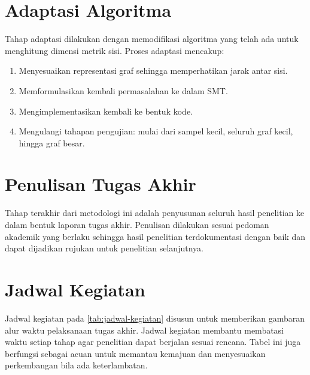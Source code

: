 \section{Adaptasi Algoritma}

Tahap adaptasi dilakukan dengan memodifikasi algoritma yang telah ada untuk menghitung dimensi metrik sisi. Proses adaptasi mencakup:

\begin{enumerate}

	\item Menyesuaikan representasi graf sehingga memperhatikan jarak antar sisi.

	\item Memformulasikan kembali permasalahan ke dalam SMT.

	\item Mengimplementasikan kembali ke bentuk kode.

	\item Mengulangi tahapan pengujian: mulai dari sampel kecil, seluruh graf kecil, hingga graf besar.

\end{enumerate}

\section{Penulisan Tugas Akhir}

Tahap terakhir dari metodologi ini adalah penyusunan seluruh hasil penelitian ke dalam bentuk laporan tugas akhir. Penulisan dilakukan sesuai pedoman akademik yang berlaku sehingga hasil penelitian terdokumentasi dengan baik dan dapat dijadikan rujukan untuk penelitian selanjutnya.

\section{Jadwal Kegiatan}

Jadwal kegiatan pada \autoref{tab:jadwal-kegiatan} disusun untuk memberikan gambaran alur waktu pelaksanaan tugas akhir. Jadwal kegiatan membantu membatasi waktu setiap tahap agar penelitian dapat berjalan sesuai rencana. Tabel ini juga berfungsi sebagai acuan untuk memantau kemajuan dan menyesuaikan perkembangan bila ada keterlambatan.

